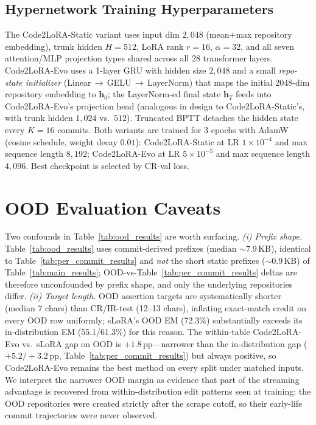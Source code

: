 \documentclass{llmxive}
\providecommand{\codelora}{Code2LoRA\xspace}
\providecommand{\codelorastatic}{\codelora-Static\xspace}
\providecommand{\codeloraevo}{\codelora-Evo\xspace}
\begin{document}
\subsection{Hypernetwork Training Hyperparameters}
\label{app:hyperparams_full}

The \codelorastatic{} variant uses input dim $2{,}048$ (mean$+$max repository embedding), trunk hidden $H{=}512$, LoRA rank $r{=}16$, $\alpha{=}32$, and all seven attention/MLP projection types shared across all $28$ transformer layers.
\codeloraevo{} uses a 1-layer GRU with hidden size $2{,}048$ and a small \emph{repo-state initializer} (Linear\,$\to$\,GELU\,$\to$\,LayerNorm) that maps the initial 2048-dim repository embedding to $\mathbf{h}_0$; the LayerNorm-ed final state $\mathbf{h}_T$ feeds into \codeloraevo{}'s projection head (analogous in design to \codelorastatic{}'s, with trunk hidden $1{,}024$ vs.\ $512$).
Truncated BPTT detaches the hidden state every $K{=}16$ commits.
Both variants are trained for $3$ epochs with AdamW (cosine schedule, weight decay $0.01$): \codelorastatic{} at LR $1{\times}10^{-4}$ and max sequence length $8{,}192$; \codeloraevo{} at LR $5{\times}10^{-5}$ and max sequence length $4{,}096$.
Best checkpoint is selected by CR-val loss.



\section{OOD Evaluation Caveats}
\label{app:ood_caveats_top}
\label{app:ood_caveats}

Two confounds in Table~\ref{tab:ood_results} are worth surfacing.
\emph{(i) Prefix shape.}
Table~\ref{tab:ood_results} uses commit-derived prefixes (median ${\sim}$7.9\,KB), identical to Table~\ref{tab:per_commit_results} and \emph{not} the short static prefixes (${\sim}$0.9\,KB) of Table~\ref{tab:main_results}; OOD-vs-Table~\ref{tab:per_commit_results} deltas are therefore unconfounded by prefix shape, and only the underlying repositories differ.
\emph{(ii) Target length.}
OOD assertion targets are systematically shorter (median 7 chars) than CR/IR-test (12--13 chars), inflating exact-match credit on every OOD row uniformly; sLoRA's OOD EM (72.3\%) substantially exceeds its in-distribution EM (55.1/61.3\%) for this reason.
The within-table \codeloraevo{} vs.\ sLoRA gap on OOD is $+1.8$\,pp---narrower than the in-distribution gap ($+5.2/+3.2$\,pp, Table~\ref{tab:per_commit_results}) but always positive, so \codeloraevo{} remains the best method on every split under matched inputs.
We interpret the narrower OOD margin as evidence that part of the streaming advantage is recovered from within-distribution edit patterns seen at training: the OOD repositories were created strictly after the scrape cutoff, so their early-life commit trajectories were never observed.
\end{document}
